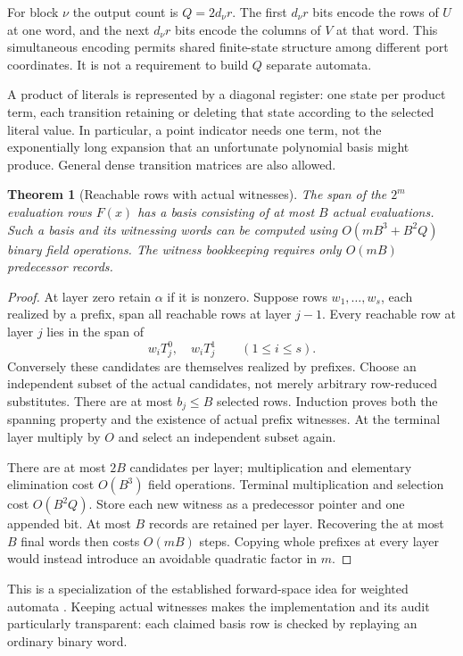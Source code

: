 \documentclass[11pt,letterpaper]{article}
\newtheorem{theorem}{Theorem}[section]
\theoremstyle{definition}
\theoremstyle{remark}
\numberwithin{equation}{section}
\begin{document}
For block $\nu$ the output count is $Q=2d_\nu r$. The first $d_\nu r$
bits encode the rows of $U$ at one word, and the next $d_\nu r$ bits
encode the columns of $V$ at that word. This simultaneous encoding permits
shared finite-state structure among different port coordinates. It is not
a requirement to build $Q$ separate automata.

A product of literals is represented by a diagonal register: one state
per product term, each transition retaining or deleting that state according
to the selected literal value. In particular, a point indicator needs one
term, not the exponentially long expansion that an unfortunate polynomial
basis might produce. General dense transition matrices are also allowed.

\begin{theorem}[Reachable rows with actual witnesses]
\label{thm:reach}
The span of the $2^m$ evaluation rows $F(x)$ has a basis consisting of at
most $B$ actual evaluations. Such a basis and its witnessing words can be
computed using $O(mB^3+B^2Q)$ binary field operations. The witness
bookkeeping requires only $O(mB)$ predecessor records.
\end{theorem}
\begin{proof}
At layer zero retain $\alpha$ if it is nonzero. Suppose rows
$w_1,\ldots,w_s$, each realized by a prefix, span all reachable rows at
layer $j-1$. Every reachable row at layer $j$ lies in the span of
\[
 w_iT_j^0,\quad w_iT_j^1\qquad(1\le i\le s).
\]
Conversely these candidates are themselves realized by prefixes. Choose
an independent subset of the actual candidates, not merely arbitrary
row-reduced substitutes. There are at most $b_j\le B$ selected rows.
Induction proves both the spanning property and the existence of actual
prefix witnesses. At the terminal layer multiply by $O$ and select an
independent subset again.

There are at most $2B$ candidates per layer; multiplication and elementary
elimination cost $O(B^3)$ field operations. Terminal multiplication and
selection cost $O(B^2Q)$. Store each new witness as a predecessor pointer
and one appended bit. At most $B$ records are retained per layer. Recovering
the at most $B$ final words then costs $O(mB)$ steps. Copying whole prefixes
at every layer would instead introduce an avoidable quadratic factor in $m$.
\end{proof}

This is a specialization of the established forward-space idea for weighted
automata \cite{kiefer}. Keeping actual witnesses makes the implementation
and its audit particularly transparent: each claimed basis row is checked
by replaying an ordinary binary word.
\end{document}
